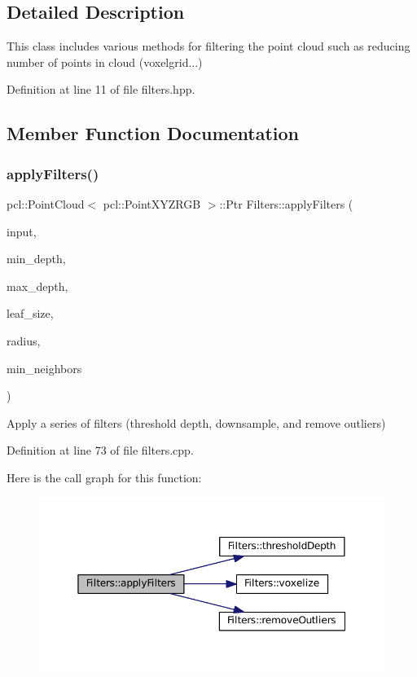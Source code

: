 \subsection{Detailed Description}
This class includes various methods for filtering the point cloud such as reducing number of points in cloud (voxelgrid...) 

Definition at line 11 of file filters.\+hpp.



\subsection{Member Function Documentation}
\hypertarget{class_filters_a05f3f0a4f537fe94b8f06b9b8b94d48d}{}\label{class_filters_a05f3f0a4f537fe94b8f06b9b8b94d48d} 
\subsubsection{\texorpdfstring{apply\+Filters()}{applyFilters()}}
{\footnotesize\ttfamily pcl\+::\+Point\+Cloud$<$ pcl\+::\+Point\+X\+Y\+Z\+R\+GB $>$\+::Ptr Filters\+::apply\+Filters (\begin{DoxyParamCaption}\item[{const pcl\+::\+Point\+Cloud$<$ pcl\+::\+Point\+X\+Y\+Z\+R\+GB $>$\+::Ptr \&}]{input,  }\item[{float}]{min\+\_\+depth,  }\item[{float}]{max\+\_\+depth,  }\item[{float}]{leaf\+\_\+size,  }\item[{float}]{radius,  }\item[{float}]{min\+\_\+neighbors }\end{DoxyParamCaption})}

Apply a series of filters (threshold depth, downsample, and remove outliers) 

Definition at line 73 of file filters.\+cpp.

Here is the call graph for this function\+:
\nopagebreak
\begin{figure}[H]
\begin{center}
\leavevmode
\includegraphics[width=350pt]{class_filters_a05f3f0a4f537fe94b8f06b9b8b94d48d_cgraph}
\end{center}
\end{figure}
\hypertarget{class_filters_a67a7521cd9568277a9285f214e282a7f}{}\label{class_filters_a67a7521cd9568277a9285f214e282a7f} 

